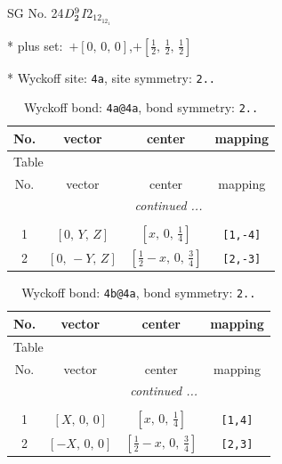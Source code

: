 \documentclass[fleqn,8pt]{jsarticle}
\begin{document}
\setcounter{MaxMatrixCols}{32}

\renewcommand{\tablename}{Table~}
\renewcommand{\figurename}{Figure~}
\begin{center}
\LARGE
SG No. 24\quad$D_{\rm 2}^{9}$\quad$I2_12_12_1$\quad[ orthorhombic ]
\end{center}

* plus set:\,\,\,$+\left[ 0,\, 0,\, 0 \right]$,\quad $+\left[ \frac{1}{2},\, \frac{1}{2},\, \frac{1}{2} \right]$


* Wyckoff site: {\tt 4a}, site symmetry: {\tt 2..}
\renewcommand{\arraystretch}{1.2}
\begin{longtable}{cccc}
\caption{Wyckoff bond: {\tt 4a@4a}, bond symmetry: {\tt 2..}}
 \\
 \hline \hline
No. & vector & center & mapping \\ \hline \endfirsthead

\multicolumn{3}{l}{\tablename\ \thetable{}} \\
 \hline \hline
No. & vector & center & mapping \\ \hline \endhead

 \hline \hline
\multicolumn{3}{r}{\footnotesize\it continued ...} \\ \endfoot

 \hline \hline
\multicolumn{3}{r}{} \\ \endlastfoot

1 & $\left[ 0,\, Y,\, Z \right]$ & $\left[ x,\, 0,\, \frac{1}{4} \right]$ & {\tt [1,-4]} \\ \hline
2 & $\left[ 0,\, - Y,\, Z \right]$ & $\left[ \frac{1}{2} - x,\, 0,\, \frac{3}{4} \right]$ & {\tt [2,-3]} \\
\end{longtable}
\renewcommand{\arraystretch}{1.2}
\begin{longtable}{cccc}
\caption{Wyckoff bond: {\tt 4b@4a}, bond symmetry: {\tt 2..}}
 \\
 \hline \hline
No. & vector & center & mapping \\ \hline \endfirsthead

\multicolumn{3}{l}{\tablename\ \thetable{}} \\
 \hline \hline
No. & vector & center & mapping \\ \hline \endhead

 \hline \hline
\multicolumn{3}{r}{\footnotesize\it continued ...} \\ \endfoot

 \hline \hline
\multicolumn{3}{r}{} \\ \endlastfoot

1 & $\left[ X,\, 0,\, 0 \right]$ & $\left[ x,\, 0,\, \frac{1}{4} \right]$ & {\tt [1,4]} \\ \hline
2 & $\left[ - X,\, 0,\, 0 \right]$ & $\left[ \frac{1}{2} - x,\, 0,\, \frac{3}{4} \right]$ & {\tt [2,3]} \\
\end{longtable}
\end{document}
